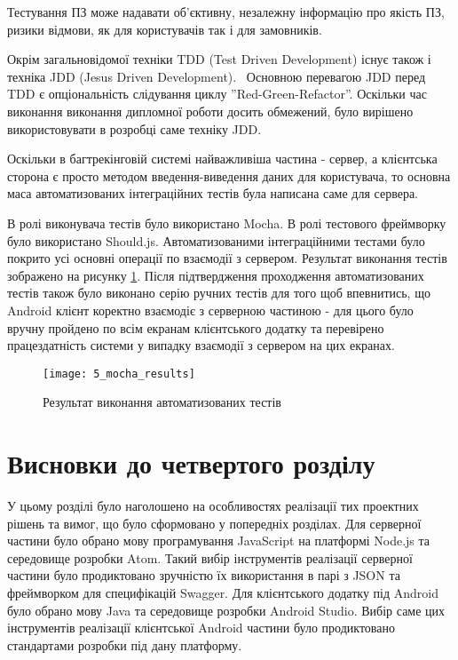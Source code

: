 \documentclass[../main.tex]{subfiles}
\begin{document}
Тестування ПЗ може надавати об'єктивну, незалежну інформацію про якість ПЗ, ризики відмови, як для користувачів так і для замовників.~\cite{agile_testing}

Окрім загальновідомої техніки TDD (Test Driven Development) існує також і техніка JDD (Jesus Driven Development).~\cite{jdd} Основною перевагою JDD перед TDD є опціональність слідування циклу ''Red-Green-Refactor''. Оскільки час виконання виконання дипломної роботи досить обмежений, було вирішено використовувати в розробці саме техніку JDD.

Оскільки в багтрекінговій системі найважливіша частина - сервер, а клієнтська сторона є просто методом введення-виведення даних для користувача, то основна маса автоматизованих інтеграційних тестів була написана саме для сервера.

В ролі виконувача тестів було використано Mocha. В ролі тестового фреймворку було використано Should.js. Автоматизованими інтеграційними тестами було покрито усі основні операції по взаємодії з сервером. Результат виконання тестів зображено на рисунку \ref{test_results}. Після підтвердження проходження автоматизованих тестів також було виконано серію ручних тестів для того щоб впевнитись, що Android клієнт коректно взаємодіє з серверною частиною - для цього було вручну пройдено по всім екранам клієнтського додатку та перевірено працездатність системи у випадку взаємодії з сервером на цих екранах.

\begin{figure}[H]
	\centering
	\texttt{[image: 5\_mocha\_results]}
	\caption{Результат виконання автоматизованих тестів}
	\label{test_results}
\end{figure}

\section{Висновки до четвертого розділу}

У цьому розділі було наголошено на особливостях реалізації тих проектних рішень та вимог, що було сформовано у попередніх розділах. Для серверної частини було обрано мову програмування JavaScript на платформі Node.js та середовище розробки Atom. Такий вибір інструментів реалізації серверної частини було продиктовано зручністю їх використання в парі з JSON та фреймворком для специфікацій Swagger. Для клієнтського додатку під Android було обрано мову Java та середовище розробки Android Studio. Вибір саме цих інструментів реалізації клієнтської Android частини було продиктовано стандартами розробки під дану платформу.
\end{document}
